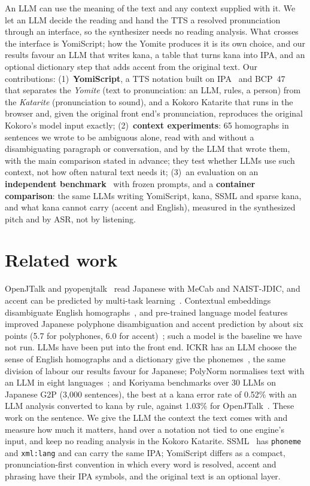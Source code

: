 \documentclass{Interspeech}
\begin{document}
An LLM can use the meaning of the text and any context supplied with it. We let an LLM decide the reading and hand
the TTS a resolved pronunciation through an interface, so the synthesizer needs no reading analysis. What crosses the
interface is YomiScript; how the Yomite produces it is its own choice, and our results favour an LLM that writes kana,
a table that turns kana into IPA, and an optional dictionary step that adds accent from the original text. Our
contributions: (1)~\textbf{YomiScript}, a TTS notation built on IPA~\cite{ipa1999handbook} and BCP~47~\cite{rfc5646}
that separates the \emph{Yomite} (text to pronunciation: an LLM, rules, a person) from the \emph{Katarite}
(pronunciation to sound), and a Kokoro Katarite that runs in the browser and, given the original front end's
pronunciation, reproduces the original Kokoro's model input exactly;
(2)~\textbf{context experiments}: 65 homographs in sentences we wrote to be ambiguous alone, read with and without
a disambiguating paragraph or conversation, and by the LLM that wrote them, with the main comparison stated in advance;
they test whether LLMs use such context, not how often natural text needs it;
(3)~an evaluation on an \textbf{independent benchmark}~\cite{koriyama2026g2p} with frozen prompts, and a
\textbf{container comparison}: the same LLMs writing YomiScript, kana, SSML and sparse kana, and what kana cannot carry
(accent and English), measured in the synthesized pitch and by ASR, not by listening.

\section{Related work}

OpenJTalk and pyopenjtalk~\cite{pyopenjtalk} read Japanese with MeCab and NAIST-JDIC, and accent can be predicted by
multi-task learning~\cite{park2022marine}. Contextual embeddings disambiguate English homographs~\cite{nicolis2021homograph},
and pre-trained language model features improved Japanese polyphone disambiguation and accent prediction by about six
points (5.7 for polyphones, 6.0 for accent)~\cite{hida2022polyphone}; such a model is the baseline we have not run. LLMs have been put into the front end.
ICKR has an LLM choose the sense of English homographs and a dictionary give the phonemes~\cite{han2024ickr}, the same
division of labour our results favour for Japanese; PolyNorm normalises text with an LLM in eight
languages~\cite{wong2025polynorm}; and Koriyama benchmarks over 30 LLMs on Japanese G2P (3{,}000 sentences), the best
at a kana error rate of 0.52\% with an LLM analysis converted to kana by rule, against 1.03\% for
OpenJTalk~\cite{koriyama2026g2p}. These work on the sentence. We give the LLM the context the text comes with and
measure how much it matters, hand over a notation not tied to one engine's input, and keep no reading analysis in the
Kokoro Katarite. SSML~\cite{ssml11} has \texttt{phoneme} and \texttt{xml:lang} and can carry the same IPA; YomiScript
differs as a compact, pronunciation-first convention in which every word is resolved, accent and phrasing have their
IPA symbols, and the original text is an optional layer.
\end{document}
